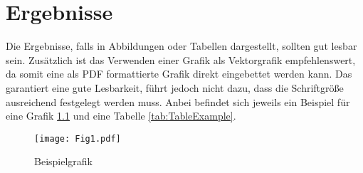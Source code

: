 

\chapter{Ergebnisse}
\label{chap:Ergebnisse}

Die Ergebnisse, falls in Abbildungen oder Tabellen dargestellt, sollten gut lesbar sein. Zusätzlich ist das Verwenden einer Grafik als Vektorgrafik empfehlenswert, da somit eine als PDF formattierte Grafik direkt eingebettet werden kann. Das garantiert eine gute Lesbarkeit, führt jedoch nicht dazu, dass die Schriftgröße ausreichend festgelegt werden muss. Anbei befindet sich jeweils ein Beispiel für eine Grafik \ref{fig:Fig1} und eine Tabelle \ref{tab:TableExample}.


\begin{figure}[h]
  \centering
  \texttt{[image: Fig1.pdf]}
  \caption{Beispielgrafik}
  \label{fig:Fig1}
\end{figure}

\begin{table}[!htbp]
  \centering
{}
  \caption{Beispieltabelle.}
	\label{tab:TableExample}
\end{table}











